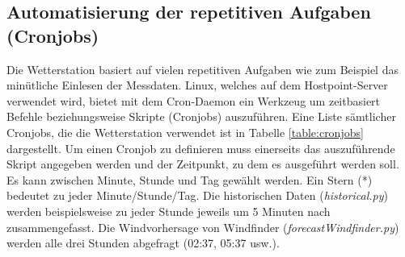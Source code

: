 \subsection{Automatisierung der repetitiven Aufgaben (Cronjobs)}


Die Wetterstation basiert auf vielen repetitiven Aufgaben wie zum Beispiel das minütliche Einlesen der Messdaten. Linux, welches auf dem Hostpoint-Server verwendet wird, bietet mit dem Cron-Daemon ein Werkzeug um zeitbasiert Befehle beziehungsweise Skripte (Cronjobs) auszuführen. Eine Liste sämtlicher Cronjobs, die die Wetterstation verwendet ist in Tabelle \ref{table:cronjobs} dargestellt. Um einen Cronjob zu definieren muss einerseits das auszuführende Skript angegeben werden und der Zeitpunkt, zu dem es ausgeführt werden soll. Es kann zwischen Minute, Stunde und Tag gewählt werden. Ein Stern (*) bedeutet zu jeder Minute/Stunde/Tag. Die historischen Daten (\emph{historical.py}) werden beispielsweise zu jeder Stunde jeweils um 5 Minuten nach zusammengefasst. Die Windvorhersage von Windfinder (\emph{forecastWindfinder.py}) werden alle drei Stunden abgefragt (02:37, 05:37 usw.).




